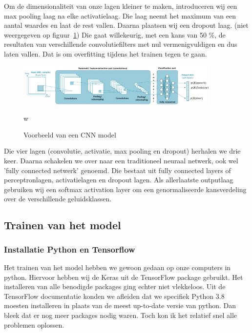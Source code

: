 Om de dimensionaliteit van onze lagen kleiner te maken, introduceren wij een max pooling laag na elke activatielaag. Die laag neemt het maximum van een aantal waardes en laat de rest vallen. Daarna plaatsen wij een dropout laag. (niet weergegeven op figuur~\ref{fig:cnn-model}) Die gaat willekeurig, met een kans van 50 \%, de resultaten van verschillende convolutiefilters met nul vermenigvuldigen en dus laten vallen. Dat is om overfitting tijdens het trainen tegen te gaan.

\begin{figure}[ht]
	\centering
	\includegraphics[width=0.9\textwidth]{figuren/cnn.png}
	\caption{Voorbeeld van een CNN model}w
	\cite{slides:cnn}
	\label{fig:cnn-model}
\end{figure}

Die vier lagen (convolutie, activatie, max pooling en dropout) herhalen we drie keer. Daarna schakelen we over naar een traditioneel neuraal netwerk, ook wel 'fully connected netwerk' genoemd. Die bestaat uit fully connected layers of perceptronlagen, activatielagen en dropout lagen. Als allerlaatste outputlaag gebruiken wij een softmax activation layer om een genormaliseerde kansverdeling over de verschillende geluidsklassen. \cite{enwiki:softmax}


\subsection{Trainen van het model}
\subsubsection{Installatie Python en Tensorflow}
Het trainen van het model hebben we gewoon gedaan op onze computers in python. Hiervoor hebben wij de Keras uit de TensorFlow package gebruikt. Het installeren van alle benodigde packages ging echter niet vlekkeloos. Uit de TensorFlow documentatie konden we afleiden dat we specifiek Python 3.8 moesten installeren in plaats van de meest up-to-date versie van python. Dan bleek dat er nog meer packages nodig waren. Toch kon ik het relatief snel alle problemen oplossen.

